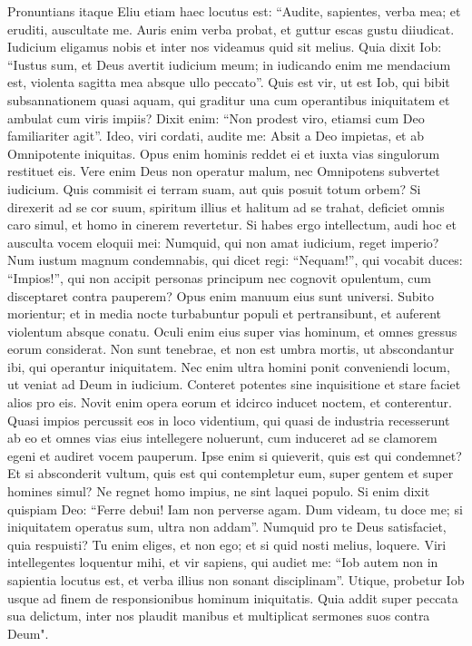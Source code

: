 \begin{biblechapter}  
\verse Pronuntians itaque Eliu etiam haec locutus est: 
\verse “Audite, sapientes, verba mea; et eruditi, auscultate me. 
\verse Auris enim verba probat, et guttur escas gustu diiudicat. 
\verse Iudicium eligamus nobis et inter nos videamus quid sit melius. 
\verse Quia dixit Iob: “Iustus sum, et Deus avertit iudicium meum; 
\verse in iudicando enim me mendacium est, violenta sagitta mea absque ullo peccato”. 
\verse Quis est vir, ut est Iob, qui bibit subsannationem quasi aquam, 
\verse qui graditur una cum operantibus iniquitatem et ambulat cum viris impiis? 
\verse Dixit enim: “Non prodest viro, etiamsi cum Deo familiariter agit”. 
\verse Ideo, viri cordati, audite me: Absit a Deo impietas, et ab Omnipotente iniquitas. 
\verse Opus enim hominis reddet ei et iuxta vias singulorum restituet eis. 
\verse Vere enim Deus non operatur malum, nec Omnipotens subvertet iudicium. 
\verse Quis commisit ei terram suam, aut quis posuit totum orbem? 
\verse Si direxerit ad se cor suum, spiritum illius et halitum ad se trahat, 
\verse deficiet omnis caro simul, et homo in cinerem revertetur. 
\verse Si habes ergo intellectum, audi hoc et ausculta vocem eloquii mei: 
\verse Numquid, qui non amat iudicium, reget imperio? Num iustum magnum condemnabis, 
\verse qui dicet regi: “Nequam!”, qui vocabit duces: “Impios!”, 
\verse qui non accipit personas principum nec cognovit opulentum, cum disceptaret contra pauperem? Opus enim manuum eius sunt universi. 
\verse Subito morientur; et in media nocte turbabuntur populi et pertransibunt, et auferent violentum absque conatu. 
\verse Oculi enim eius super vias hominum, et omnes gressus eorum considerat. 
\verse Non sunt tenebrae, et non est umbra mortis, ut abscondantur ibi, qui operantur iniquitatem. 
\verse Nec enim ultra homini ponit conveniendi locum, ut veniat ad Deum in iudicium. 
\verse Conteret potentes sine inquisitione et stare faciet alios pro eis. 
\verse Novit enim opera eorum et idcirco inducet noctem, et conterentur. 
\verse Quasi impios percussit eos in loco videntium, 
\verse qui quasi de industria recesserunt ab eo et omnes vias eius intellegere noluerunt, 
\verse cum induceret ad se clamorem egeni et audiret vocem pauperum. 
\verse Ipse enim si quieverit, quis est qui condemnet? Et si absconderit vultum, quis est qui contempletur eum, super gentem et super homines simul? 
\verse Ne regnet homo impius, ne sint laquei populo. 
\verse Si enim dixit quispiam Deo: “Ferre debui! Iam non perverse agam. 
\verse Dum videam, tu doce me; si iniquitatem operatus sum, ultra non addam”. 
\verse Numquid pro te Deus satisfaciet, quia respuisti? Tu enim eliges, et non ego; et si quid nosti melius, loquere. 
\verse Viri intellegentes loquentur mihi, et vir sapiens, qui audiet me: 
\verse “Iob autem non in sapientia locutus est, et verba illius non sonant disciplinam”. 
\verse Utique, probetur Iob usque ad finem de responsionibus hominum iniquitatis. 
\verse Quia addit super peccata sua delictum, inter nos plaudit manibus et multiplicat sermones suos contra Deum". 
\end{biblechapter}

